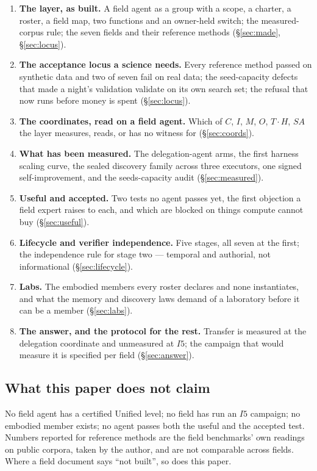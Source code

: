 \documentclass[11pt]{article}
\theoremstyle{definition}
\begin{document}
\begin{enumerate}[leftmargin=*,itemsep=2pt]
\item \textbf{The layer, as built.} A field agent as a group with a scope, a charter, a roster, a field map, two functions and an owner-held switch; the measured-corpus rule; the seven fields and their reference methods (\S\ref{sec:made}, \S\ref{sec:locus}).
\item \textbf{The acceptance locus a science needs.} Every reference method passed on synthetic data and two of seven fail on real data; the seed-capacity defects that made a night's validation validate on its own search set; the refusal that now runs before money is spent (\S\ref{sec:locus}).
\item \textbf{The coordinates, read on a field agent.} Which of $C$, $I$, $M$, $O$, $T\cdot H$, $SA$ the layer measures, reads, or has no witness for (\S\ref{sec:coords}).
\item \textbf{What has been measured.} The delegation-agent arms, the first harness scaling curve, the sealed discovery family across three executors, one signed self-improvement, and the seeds-capacity audit (\S\ref{sec:measured}).
\item \textbf{Useful and accepted.} Two tests no agent passes yet, the first objection a field expert raises to each, and which are blocked on things compute cannot buy (\S\ref{sec:useful}).
\item \textbf{Lifecycle and verifier independence.} Five stages, all seven at the first; the independence rule for stage two --- temporal and authorial, not informational (\S\ref{sec:lifecycle}).
\item \textbf{Labs.} The embodied members every roster declares and none instantiates, and what the memory and discovery laws demand of a laboratory before it can be a member (\S\ref{sec:labs}).
\item \textbf{The answer, and the protocol for the rest.} Transfer is measured at the delegation coordinate and unmeasured at $I5$; the campaign that would measure it is specified per field (\S\ref{sec:answer}).
\end{enumerate}

\subsection{What this paper does not claim}

No field agent has a certified Unified level; no field has run an $I5$ campaign; no embodied member exists; no agent passes both the useful and the accepted test. Numbers reported for reference methods are the field benchmarks' own readings on public corpora, taken by the author, and are not comparable across fields. Where a field document says ``not built'', so does this paper.
\end{document}
